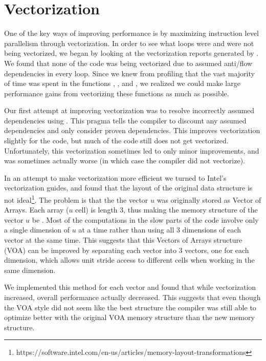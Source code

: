 \section{Vectorization}

One of the key ways of improving performance is by maximizing instruction level parallelism through vectorization. In order to see what loops were and were not being vectorized, we began by looking at the vectorization reports generated by . We found that none of the  code was being vectorized due to assumed anti/flow dependencies in every  loop. Since we knew from profiling that the vast majority of time was spent in the functions , , and , we realized we could make large performance gains from vectorizing these functions as much as possible.

Our first attempt at improving vectorization was to resolve incorrectly assumed dependencies using . This pragma tells the compiler to discount any assumed dependencies and only consider proven dependencies. This improves vectorization slightly for the  code, but much of the code still does not get vectorized. Unfortunately, this vectorization sometimes led to only minor improvements, and was sometimes actually worse (in which case the compiler did not vectorize).

In an attempt to make vectorization more efficient we turned to Intel's vectorization guides, and found that the layout of the original data structure is not ideal\footnote{https://software.intel.com/en-us/articles/memory-layout-transformations}. The problem is that the the vector $u$ was originally stored as Vector of Arrays. Each array ($u$ cell) is length 3, thus making the memory structure of the vector $u$ be \ttt{[U0, U1, U2, U0, U1, U2, ...]}. Most of the computations in the slow parts of the code involve only a single dimension of $u$ at a time rather than using all 3 dimensions of each vector at the same time. This suggests that this Vectors of Arrays structure (VOA) can be improved by separating each vector into 3 vectors, one for each dimension, which allows unit stride access to different cells when working in the same dimension.

We implemented this method for each vector and found that while vectorization increased, overall performance actually decreased. This suggests that even though the VOA style did not seem like the best structure the compiler was still able to optimize better with the original VOA memory structure than the new memory structure.

